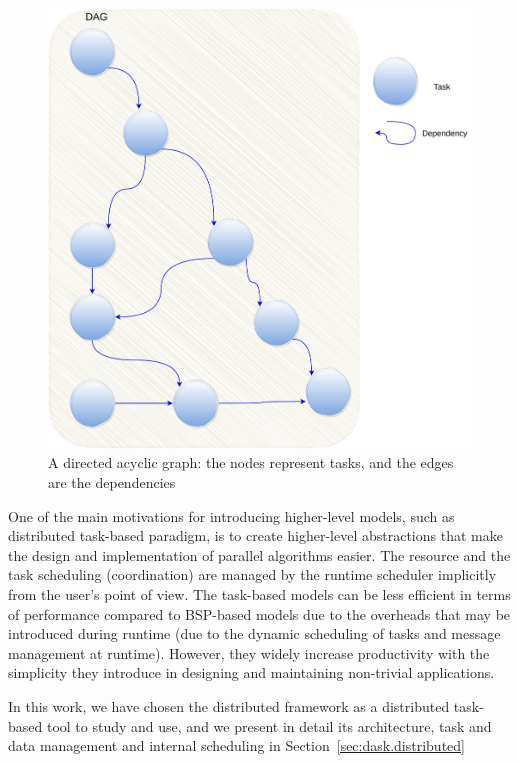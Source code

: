 \begin{figure}[tb]\centering
\includegraphics[scale=0.5]{figures/dag.pdf}
\caption{A directed acyclic graph: the nodes represent tasks, and the edges are the dependencies}
\label{figdag}
\end{figure}

One of the main motivations for introducing higher-level models, such as distributed task-based paradigm, is to create higher-level abstractions that make the design and implementation of parallel algorithms easier. The resource and the task scheduling (coordination) are managed by the runtime scheduler implicitly from the user's point of view. 
The task-based models can be less efficient in terms of performance compared to BSP-based models due to the overheads that may be introduced during runtime (due to the dynamic scheduling of tasks and message management at runtime). However, they widely increase productivity with the simplicity they introduce in designing and maintaining non-trivial applications.   

In this work, we have chosen the \dask distributed framework as a distributed task-based tool to study and use, and we present in detail its architecture, task and data management and internal scheduling in Section~\ref{sec:dask.distributed} 


